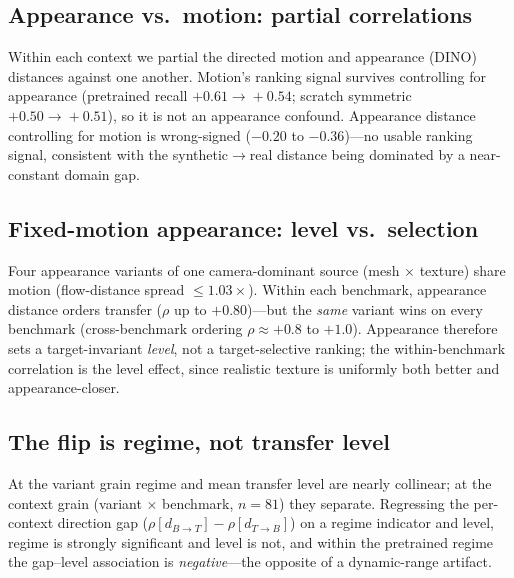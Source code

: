 \documentclass[runningheads]{llncs}
\newcommand{\dtb}{d_{T\to B}}
\newcommand{\dbt}{d_{B\to T}}
\begin{document}
\subsection{Appearance vs.\ motion: partial correlations}
Within each context we partial the directed motion and appearance (DINO)
distances against one another. Motion's ranking signal survives controlling
for appearance (pretrained recall $+0.61\!\to\!+0.54$; scratch symmetric
$+0.50\!\to\!+0.51$), so it is not an appearance confound. Appearance distance
controlling for motion is wrong-signed ($-0.20$ to $-0.36$)---no usable ranking
signal, consistent with the synthetic$\to$real distance being dominated by a
near-constant domain gap.
\begin{table}[h]\centering\small

\caption{Raw and partial within-context Spearman correlations of transfer with
the directed motion and appearance distances.}
\label{tab:new_partial}
\end{table}

\subsection{Fixed-motion appearance: level vs.\ selection}
Four appearance variants of one camera-dominant source (mesh $\times$ texture)
share motion (flow-distance spread $\le 1.03\times$). Within each benchmark,
appearance distance orders transfer ($\rho$ up to $+0.80$)---but the
\emph{same} variant wins on every benchmark (cross-benchmark ordering
$\rho \approx +0.8$ to $+1.0$). Appearance therefore sets a target-invariant
\emph{level}, not a target-selective ranking; the within-benchmark correlation
is the level effect, since realistic texture is uniformly both better and
appearance-closer.
\begin{table}[h]\centering\small

\caption{Peak PCK of four fixed-motion appearance variants across benchmarks.
Within-benchmark $\rho$(pck,$-$appearance dist.) is $+0.60/+0.80/+0.80$; the
cross-benchmark ordering correlation is $+0.80/+1.00/+0.80$---the same variant
wins everywhere (level, not selection).}
\label{tab:new_fixedmotion}
\end{table}

\subsection{The flip is regime, not transfer level}
At the variant grain regime and mean transfer level are nearly collinear; at
the context grain (variant $\times$ benchmark, $n{=}81$) they separate.
Regressing the per-context direction gap ($\rho[\dbt]-\rho[\dtb]$) on a regime
indicator and level, regime is strongly significant and level is not, and
within the pretrained regime the gap--level association is \emph{negative}---the
opposite of a dynamic-range artifact.
\begin{table}[h]\centering\small

\caption{Deconfounding the direction flip from transfer level. $R^2$ is
$0.41$ regime-only vs $0.11$ level-only; within the pretrained regime
$\rho$(gap,level)$=-0.41$ (scratch $+0.42$).}
\label{tab:new_regimelevel}
\end{table}
\end{document}
